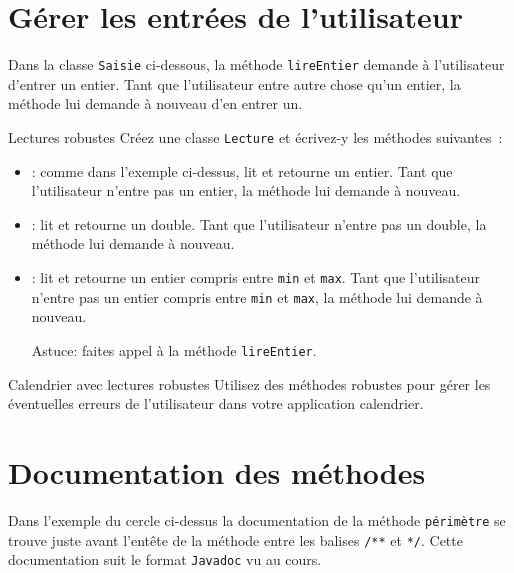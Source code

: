 \documentclass[a4paper,11pt]{style-esi/td}
\begin{document}
\section{Gérer les entrées de l'utilisateur}

	Dans la classe \texttt{Saisie} ci-dessous, la méthode \texttt{lireEntier} demande à l'utilisateur d'entrer un entier.
	Tant que l'utilisateur entre autre chose qu'un entier, la méthode lui demande à nouveau d'en entrer un. 
	

	
	
	\begin{Exercice}{Lectures robustes}
		Créez une classe \texttt{Lecture} et écrivez-y les méthodes suivantes~:
		\begin{itemize}
			\item {}: comme dans l'exemple ci-dessus, lit et retourne un entier.
				Tant que l'utilisateur n'entre pas un entier, la méthode lui demande à nouveau.
			\item {}: lit et retourne un double.
				Tant que l'utilisateur n'entre pas un double, la méthode lui demande à nouveau.
			\item {}: lit et retourne un entier 
				compris entre \texttt{min} et \texttt{max}.
				Tant que l'utilisateur n'entre pas un entier compris entre \texttt{min} et \texttt{max}, 
				la méthode lui demande à nouveau.
				
				Astuce: faites appel à la méthode \texttt{lireEntier}.
		\end{itemize}
	\end{Exercice}
	
	\begin{Exercice}{Calendrier avec lectures robustes}
		Utilisez des méthodes robustes pour gérer les éventuelles erreurs de l'utilisateur dans votre application calendrier.
	\end{Exercice}


\section{Documentation des méthodes}

	Dans l'exemple du cercle ci-dessus la documentation de la méthode \texttt{périmètre} 
	se trouve juste avant l'entête de la méthode entre les balises \texttt{/**} et \texttt{*/}.
	Cette documentation suit le format \texttt{Javadoc} vu au cours.
	
\end{document}
